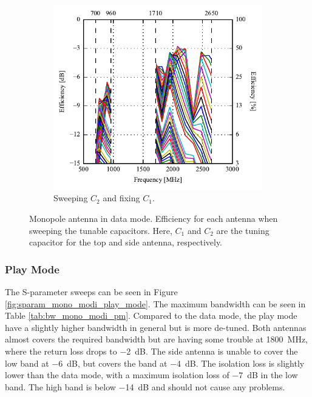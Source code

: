 \begin{figure}[htbp]
\begin{subfigure}{0.49\linewidth}
        \includegraphics{img/tech_sol/monopole/highband/ue/datamode/eff_side.pdf}
        \caption{Sweeping $C_2$ and fixing $C_1$.}
    \end{subfigure}
    \caption{Monopole antenna in data mode. Efficiency for each antenna when sweeping the tunable capacitors. Here, $C_1$ and $C_2$ are the tuning capacitor for the top and side antenna, respectively.}
    \label{fig:eff_mono_modi_data_mode}
\end{figure}

\FloatBarrier
\subsubsection{Play Mode}
The S-parameter sweeps can be seen in Figure \ref{fig:sparam_mono_modi_play_mode}. The maximum bandwidth can be seen in Table \ref{tab:bw_mono_modi_pm}. Compared to the data mode, the play mode have a slightly higher bandwidth in general but is more de-tuned. Both antennas almost covers the required bandwidth but are having some trouble at \SI{1800}{MHz}, where the return loss drops to \SI{-2}{dB}. The side antenna is unable to cover the low band at \SI{-6}{dB}, but covers the band at \SI{-4}{dB}.
The isolation loss is slightly lower than the data mode, with a maximum isolation loss of \SI{-7}{dB} in the low band. The high band is below \SI{-14}{dB} and should not cause any problems.


